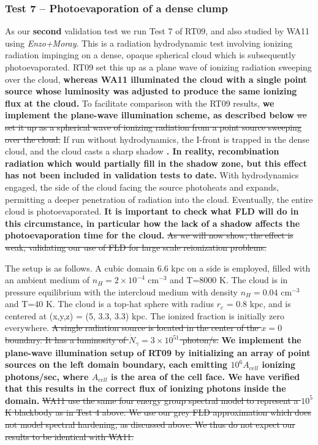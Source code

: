 \subsubsection{Test 7 -- Photoevaporation of a dense clump}
\label{subsubsec:test7}
As our {\bf second} validation test we run Test 7 of RT09, and also studied by WA11 using {\em Enzo+Moray}. 
This is a radiation hydrodynamic test involving ionizing radiation impinging on a dense, opaque spherical cloud
which is subsequently photoevaporated. RT09 set this up as a plane wave of ionizing radiation sweeping over the 
cloud, {\bf whereas WA11 illuminated the cloud with a single point source whose luminosity was adjusted to produce the same ionizing flux at the cloud.} To facilitate comparison with the RT09 results, {\bf we implement the plane-wave illumination scheme, as described below} \st{we set it up as a spherical wave of ionizing radiation from
a point source sweeping over the cloud.} If run without hydrodynamics, the I-front is trapped in the dense cloud,
and the cloud casts a sharp shadow {\bf \citep{IlievEtAl2006}.  In reality, recombination radiation which would partially fill in the shadow zone, but this effect has not been included in validation tests to date. } With hydrodynamics engaged, the side of the cloud facing the source photoheats and expands, permitting a deeper
penetration of radiation into the cloud. Eventually, the entire cloud is photoevaporated. {\bf It is important to check
what FLD will do in this circumstance, in particular how the lack of a shadow affects the
photoevaporation time for the cloud.} \st{As we will now show, the effect is weak, validating our use of FLD for
large scale reionization problems.} 

The setup is as follows. A cubic domain 6.6 kpc on a side is employed, filled with an ambient medium of 
$n_H = 2 \times 10^{-4}$ cm$^{-3}$ and T=8000 K. The cloud is in pressure equilibrium with the intercloud
medium with density $n_H = 0.04$ cm$^{-3}$ and T=40 K. The cloud is a top-hat sphere with radius
$r_c$ = 0.8 kpc, and is centered at (x,y,z) = (5, 3.3, 3.3) kpc. The ionized fraction is initially zero everywhere. 
\st{A single radiation source is located in the center of the $x=0$ boundary. It has a luminosity of 
$\dot{N}_{\gamma}=3 \times 10^{51}$ photon/s.}
{\bf We implement the plane-wave illumination setup of RT09 by initializing an array of point sources on the left domain boundary, each emitting $10^6 A_{cell}$ ionizing photons/sec, where $A_{cell}$ is the area of the cell face. We have verified that this results in the correct flux of ionizing photons inside the domain.} \st{WA11 use the same four energy group spectral model to
represent a $10^5$ K blackbody as in Test 4 above. We use our grey FLD approximation which does not
model spectral hardening, as discussed above. We thus do not expect our results to be identical with WA11. }

